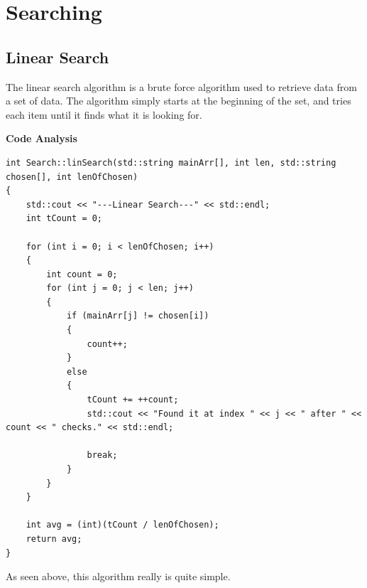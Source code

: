 \documentclass[letterpaper, 10pt]{article}
\begin{document}
\section{Searching}

\subsection{Linear Search}

The linear search algorithm is a brute force algorithm used to retrieve data from a set of data. The algorithm simply starts at the beginning of the set, and tries each item until it finds what it is looking for.
\vspace{1em}
\begin{center}
    \textbf{Code Analysis}
\end{center}
\begin{addmargin}[-5em]{1em}
\begin{small}
\begin{verbatim}
int Search::linSearch(std::string mainArr[], int len, std::string chosen[], int lenOfChosen)
{
	std::cout << "---Linear Search---" << std::endl;
	int tCount = 0;

	for (int i = 0; i < lenOfChosen; i++)
	{
		int count = 0;
		for (int j = 0; j < len; j++)
		{
			if (mainArr[j] != chosen[i])
			{
				count++;
			}
			else
			{
				tCount += ++count;
				std::cout << "Found it at index " << j << " after " << count << " checks." << std::endl;

				break;
			}
		}
	}

	int avg = (int)(tCount / lenOfChosen);
	return avg;
}

\end{verbatim}
\end{small}
\end{addmargin}

As seen above, this algorithm really is quite simple.
\vspace{1em}
\end{document}
